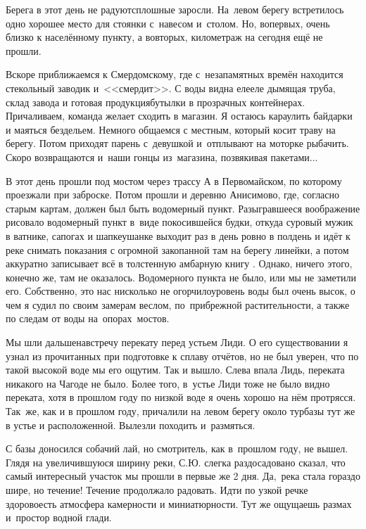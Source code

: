 Берега в этот день не радуют\mdash  сплошные заросли. На~левом берегу встретилось одно хорошее место для стоянки с~навесом и~столом. Но, во\sdash первых, очень близко к населённому пункту, а во\sdash вторых, километраж на сегодня ещё не прошли. 

Вскоре приближаемся к Смердомскому, где с~незапамятных времён находится стекольный заводик и~<<смердит>>. С воды видна еле\sdash еле дымящая труба, склад завода и готовая продукция\mdash  бутылки в прозрачных контейнерах. Причаливаем, команда желает сходить в магазин. Я остаюсь караулить байдарки и маяться бездельем. Немного общаемся с местным, который косит траву на берегу. Потом приходят парень с~девушкой и~отплывают на моторке рыбачить. Скоро возвращаются и~наши гонцы из~магазина, позвякивая пакетами$\ldots$ 

В этот день прошли под мостом через трассу А в Первомайском, по которому проезжали при заброске. Потом прошли и деревню Анисимово, где, согласно старым картам, должен был быть водомерный пункт. Разыгравшееся воображение рисовало водомерный пункт в~виде покосившейся будки, откуда суровый мужик в ватнике, сапогах и шапке\sdash ушанке выходит раз в день ровно в полдень и идёт к реке снимать показания с огромной закопанной там на берегу линейки, а потом аккуратно записывает всё в толстенную амбарную книгу {}. Однако, ничего этого, конечно же, там не оказалось. Водомерного пункта не было, или мы не заметили его. Собственно, это нас нисколько не огорчило\mdash уровень воды был очень высок, о чем я судил по своим замерам веслом, по~прибрежной растительности, а также по следам от воды на~опорах~мостов. 

Мы шли дальше\mdash  навстречу перекату перед устьем Лиди. О его существовании я узнал из прочитанных при подготовке к сплаву отчётов, но не был уверен, что по такой высокой воде мы его ощутим. Так и вышло. Слева впала Лидь, переката никакого на Чагоде не было. Более того, в~устье Лиди тоже не было видно переката, хотя в прошлом году по низкой воде я очень хорошо на нём протрясся. Так~же, как и в прошлом году, причалили на левом берегу около турбазы тут же в устье и расположенной. Вылезли походить и~размяться. 

С базы доносился собачий лай, но смотритель, как в~прошлом году, не вышел. Глядя на увеличившуюся ширину реки, С.Ю. слегка раздосадовано сказал, что самый интересный участок мы прошли в первые же 2 дня. Да,~река стала гораздо шире, но течение! Течение продолжало радовать. Идти по узкой речке здорово\mdash  есть атмосфера камерности и миниатюрности. Тут же ощущаешь размах и~простор водной глади.

